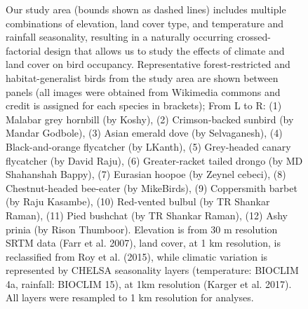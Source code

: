 \begin{figure}[t!]
{        Our study area (bounds shown as dashed lines) includes multiple combinations of elevation, land cover type, and temperature and rainfall seasonality, resulting in a naturally occurring crossed-factorial design that allows us to study the effects of climate and land cover on bird occupancy. 
        Representative forest-restricted and habitat-generalist birds from the study area are shown between panels (all images were obtained from Wikimedia commons and credit is assigned for each species in brackets); From L to R: (1) Malabar grey hornbill (by Koshy), (2) Crimson-backed sunbird (by Mandar Godbole), (3) Asian emerald dove (by Selvaganesh), (4) Black-and-orange flycatcher (by LKanth), (5) Grey-headed canary flycatcher (by David Raju), (6) Greater-racket tailed drongo (by MD Shahanshah Bappy), (7) Eurasian hoopoe (by Zeynel cebeci), (8) Chestnut-headed bee-eater (by MikeBirds), (9) Coppersmith barbet (by Raju Kasambe), (10) Red-vented bulbul (by TR Shankar Raman), (11) Pied bushchat (by TR Shankar Raman), (12) Ashy prinia (by Rison Thumboor). 
        Elevation is from 30 m resolution SRTM data (Farr et al. 2007), land cover, at 1 km resolution, is reclassified from Roy et al. (2015), while climatic variation is represented by CHELSA seasonality layers (temperature: BIOCLIM 4a, rainfall: BIOCLIM 15), at 1km resolution (Karger et al. 2017). All layers were resampled to 1 km resolution for analyses.
    }
    \label{hilly_fig_01}
\end{figure}

